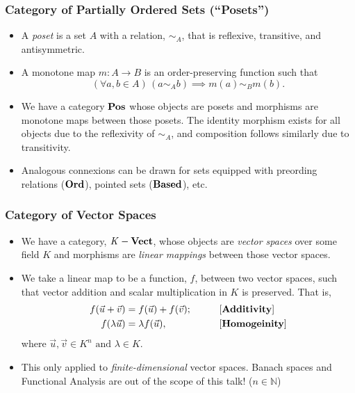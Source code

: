\documentclass{beamer}
\numberwithin{figure}{section}
\DeclareMathOperator{\catpos}{\text{\textbf{Pos}}}
\DeclareMathOperator{\catvect}{\mathit{K}-\text{\textbf{Vect}}}
\DeclareMathOperator{\catpre}{\text{\textbf{Ord}}}
\DeclareMathOperator{\catpoint}{\text{\textbf{Based}}}
\begin{document}
\begin{frame}
        \frametitle{Category of Partially Ordered Sets (``Posets'')}
        \begin{itemize}
                \item A \emph{poset} is a set $A$ with a relation, $\sim_A$,
                        that is reflexive, transitive, and antisymmetric.
                \item A monotone map $m \colon A \to B $ is an
                        order-preserving function such that
                        \begin{equation*}
                                (\forall a, b\in A)\,(a \sim_A b)
                                \implies m(a) \sim_B m(b).
                        \end{equation*}
                \item We have a category $\catpos$ whose objects are posets and
                        morphisms are monotone maps between those posets. The
                        identity morphism exists for all objects due to the
                        reflexivity of $\sim_A$, and composition follows
                        similarly due to transitivity.
                \item Analogous connexions can be drawn for sets equipped with
                        preording relations ($\catpre$), pointed sets
                        ($\catpoint$), etc.
        \end{itemize}
\end{frame}

\begin{frame}
        \frametitle{Category of Vector Spaces}
        \begin{itemize}
                \item We have a category, $\catvect$, whose objects are
                        \emph{vector spaces} over some field $K$ and morphisms
                        are \emph{linear mappings} between those vector spaces.
                \item We take a linear map to be a function, $f$, between two
                        vector spaces, such that vector addition and scalar
                        multiplication in $K$ is preserved. That is,
                        \begin{alignat*}{2}
                                f(\vec{u}+\vec{v}) &= f(\vec{u})+f(\vec{v});
                                \qquad && \text{[\textbf{Additivity}]} \\
                                f(\lambda\vec{u}) &= \lambda f(\vec{u}),
                                \qquad && \text{[\textbf{Homogeinity}]}
                        \end{alignat*}
                        where $\vec{u},\vec{v}\in K^n \text{ and }\lambda\in K$.
                \item This only applied to \emph{finite-dimensional} vector
                        spaces. Banach spaces and Functional Analysis are out of
                        the scope of this talk! ($n\in\mathbb{N}$)
        \end{itemize}
\end{frame}
\end{document}
